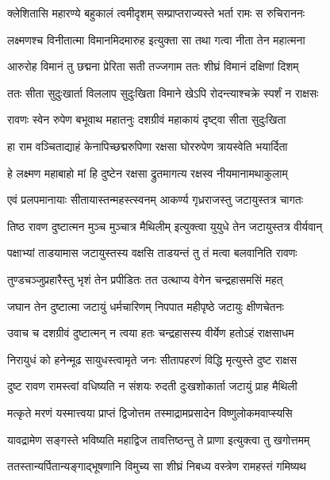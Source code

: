 \twolineshloka
{क्लेशितासि महारण्ये बहुकालं त्वमीदृशम्}
{सम्प्राप्तराज्यस्ते भर्ता रामः स रुचिराननः} %

\twolineshloka
{लक्ष्मणश्च विनीतात्मा विमानमिदमारुह}
{इत्युक्ता सा तथा गत्वा नीता तेन महात्मना} %

\twolineshloka
{आरुरोह विमानं तु छद्मना प्रेरिता सती}
{तज्जगाम ततः शीघ्रं विमानं दक्षिणां दिशम्} %

\twolineshloka
{ततः सीता सुदुःखार्ता विललाप सुदुःखिता}
{विमाने खेऽपि रोदन्त्याश्चक्रे स्पर्शं न राक्षसः} %

\twolineshloka
{रावणः स्वेन रुपेण बभूवाथ महातनुः}
{दशग्रीवं महाकायं दृष्ट्वा सीता सुदुःखिता} %

\twolineshloka
{हा राम वञ्चिताद्याहं केनापिच्छद्मरुपिणा}
{रक्षसा घोररुपेण त्रायस्वेति भयार्दिता} %

\twolineshloka
{हे लक्ष्मण महाबाहो मां हि दुष्टेन रक्षसा}
{द्रुतमागत्य रक्षस्व नीयमानामथाकुलाम्} %

\twolineshloka
{एवं प्रलपमानायाः सीतायास्तन्महस्त्स्वनम्}
{आकर्ण्य गृध्रराजस्तु जटायुस्तत्र चागतः} %

\twolineshloka
{तिष्ठ रावण दुष्टात्मन मुञ्च मुञ्चात्र मैथिलीम्}
{इत्युक्त्वा युयुधे तेन जटायुस्तत्र वीर्यवान्} %

\twolineshloka
{पक्षाभ्यां ताडयामास जटायुस्तस्य वक्षसि}
{ताडयन्तं तु तं मत्वा बलवानिति रावणः} %

\twolineshloka
{तुण्डचञ्जुप्रहारैस्तु भृशं तेन प्रपीडितः}
{तत उत्थाप्य वेगेन चन्द्रहासमसिं महत्} %

\twolineshloka
{जघान तेन दुष्टात्मा जटायुं धर्मचारिणम्}
{निपपात महीपृष्ठे जटायुः क्षीणचेतनः} %

\twolineshloka
{उवाच च दशग्रीवं दुष्टात्मन् न त्वया हतः}
{चन्द्रहासस्य वीर्येण हतोऽहं राक्षसाधम} %

\twolineshloka
{निरायुधं को हनेन्मूढ सायुधस्त्वामृते जनः}
{सीतापहरणं विद्धि मृत्युस्ते दुष्ट राक्षस} %

\twolineshloka
{दुष्ट रावण रामस्त्वां वधिष्यति न संशयः}
{रुदती दुःखशोकार्ता जटायुं प्राह मैथिली} %

\twolineshloka
{मत्कृते मरणं यस्मात्त्वया प्राप्तं द्विजोत्तम}
{तस्माद्रामप्रसादेन विष्णुलोकमवाप्स्यसि} %

\twolineshloka
{यावद्रामेण सङ्गस्ते भविष्यति महाद्विज}
{तावत्तिष्ठन्तु ते प्राणा इत्युक्त्वा तु खगोत्तमम्} %

\twolineshloka
{ततस्तान्यर्पितान्यङ्गाद्भूषणानि विमुच्य सा}
{शीघ्रं निबध्य वस्त्रेण रामहस्तं गमिष्यथ} %

